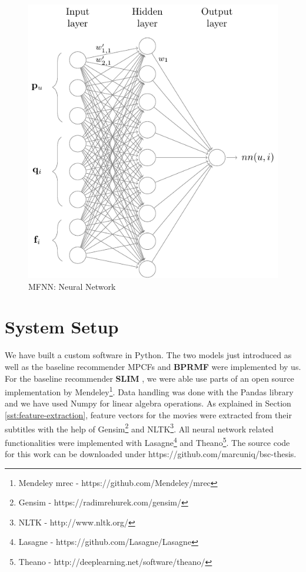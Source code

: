 \begin{figure}[p]
	\centering
	\includegraphics[width=0.9\linewidth]{./section-chapter1/figures/mfnn.pdf}
	\caption[MFNN: Neural Network]
	{MFNN: Neural Network}
	\label{f:mfnn}
\end{figure}

\section{System Setup}
\label{st:system-setup} 

We have built a custom software in Python.
The two models just introduced as well as the baseline recommender MPCFs \cite{Kabbur2015} and \textbf{BPRMF} \cite{Rendle2009} were implemented by us.
For the baseline recommender \textbf{SLIM} \cite{Ning2011}, we were able use parts of an open source implementation by Mendeley\footnote{Mendeley mrec - https://github.com/Mendeley/mrec}.
Data handling was done with the Pandas library and we have used Numpy for linear algebra operations.
As explained in Section \ref{sst:feature-extraction}, feature vectors for the movies were extracted from their subtitles with the help of Gensim\footnote{Gensim - https://radimrehurek.com/gensim/} and NLTK\footnote{NLTK - http://www.nltk.org/}.
All neural network related functionalities were implemented with Lasagne\footnote{Lasagne - https://github.com/Lasagne/Lasagne} and Theano\footnote{Theano - http://deeplearning.net/software/theano/}.
The source code for this work can be downloaded under https://github.com/marcuniq/bsc-thesis.
